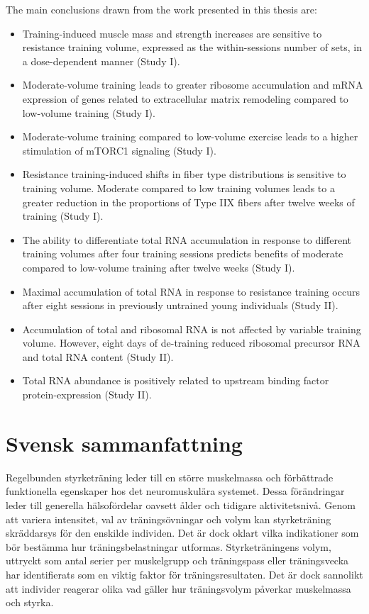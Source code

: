 \documentclass[twoside,10pt]{gihclass} %
\begin{document}
The main conclusions drawn from the work presented in this thesis are:
\begin{itemize}
  \item Training-induced muscle mass and strength increases are sensitive to resistance training volume, expressed as the within-sessions number of sets, in a dose-dependent manner (Study I).
  \item Moderate-volume training leads to greater ribosome accumulation and mRNA expression of genes related to extracellular matrix remodeling compared to low-volume training (Study I).
  \item Moderate-volume training compared to low-volume exercise leads to a higher stimulation of mTORC1 signaling (Study I).
  \item Resistance training-induced shifts in fiber type distributions is sensitive to training volume. Moderate compared to low training volumes leads to a greater reduction in the proportions of Type IIX fibers after twelve weeks of training (Study I).
  \item The ability to differentiate total RNA accumulation in response to different training volumes after four training sessions predicts benefits of moderate compared to low-volume training after twelve weeks (Study I).
  \item Maximal accumulation of total RNA in response to resistance training occurs after eight sessions in previously untrained young individuals (Study II).
  \item Accumulation of total and ribosomal RNA is not affected by variable training volume. However, eight days of de-training reduced ribosomal precursor RNA and total RNA content (Study II).
  \item Total RNA abundance is positively related to upstream binding factor protein-expression (Study II).
\end{itemize}
\hypertarget{svensk-sammanfattning}{%
\chapter{Svensk sammanfattning}\label{svensk-sammanfattning}}

Regelbunden styrketräning leder till en större muskelmassa och förbättrade funktionella egenskaper hos det neuromuskulära systemet. Dessa förändringar leder till generella hälsofördelar oavsett ålder och tidigare aktivitetsnivå. Genom att variera intensitet, val av träningsövningar och volym kan styrketräning skräddarsys för den enskilde individen. Det är dock oklart vilka indikationer som bör bestämma hur träningsbelastningar utformas. Styrketräningens volym, uttryckt som antal serier per muskelgrupp och träningspass eller träningsvecka har identifierats som en viktig faktor för träningsresultaten. Det är dock sannolikt att individer reagerar olika vad gäller hur träningsvolym påverkar muskelmassa och styrka.
\end{document}
